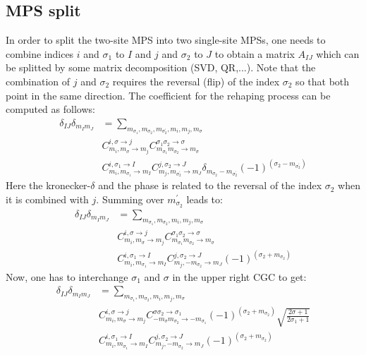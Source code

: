 \documentclass[a4paper,10pt,parskip=full]{scrartcl}
\begin{document}
\subsection{MPS split}
In order to split the two-site MPS into two single-site MPSs, one
needs to combine indices $i$ and $\sigma_1$ to $I$ and $j$ and $\sigma_2$ to $J$
to obtain a matrix $A_{IJ}$ which can be splitted by some matrix
decomposition (SVD, QR,...). Note that the combination of $j$ and
$\sigma_2$ requires the reversal (flip) of the index $\sigma_2$ so that both
point in the same direction. The coefficient for the rehaping process
can be computed as follows:
\begin{equation}
  \begin{split}
    \delta_{IJ}\delta_{m_Im_J}&=
    \sum_{m_{\sigma_1},m_{\sigma_2}, m_{\sigma_2^\prime},m_{i},m_j,m_{\sigma}}\\
    &C^{i,\sigma\rightarrow j}_{m_{i},m_{\sigma}\rightarrow m_{j}}
    C^{\sigma_1\sigma_2\rightarrow\sigma}_{m_{\sigma_1}m_{\sigma_2}\rightarrow m_{\sigma}}\\
    &C^{i,\sigma_1\rightarrow I}_{m_i,m_{\sigma_1}\rightarrow m_{I}}
    C^{j,\sigma_2\rightarrow J}_{m_j,m_{\sigma_2^\prime}\rightarrow m_{J}}\delta_{m_{\sigma_2}-m_{\sigma_2^\prime}}(-1)^{(\sigma_2-m_{\sigma_2^\prime})}
  \end{split}
\end{equation}
Here the kronecker-$\delta$ and the phase is related to the reversal
of the index $\sigma_2$ when it is combined with $j$.
Summing over $m_{\sigma_2}^\prime$ leads to:
\begin{equation}
  \begin{split}
    \delta_{IJ}\delta_{m_Im_J}&=
    \sum_{m_{\sigma_1},m_{\sigma_2},m_{i},m_j,m_{\sigma}}\\
    &C^{i,\sigma\rightarrow j}_{m_{i},m_{\sigma}\rightarrow m_{j}}
    C^{\sigma_1\sigma_2\rightarrow\sigma}_{m_{\sigma_1}m_{\sigma_2}\rightarrow m_{\sigma}}\\
    &C^{i,\sigma_1\rightarrow I}_{m_i,m_{\sigma_1}\rightarrow m_{I}}
    C^{j,\sigma_2\rightarrow J}_{m_j,-m_{\sigma_2}\rightarrow m_{J}}(-1)^{(\sigma_2+m_{\sigma_2})}
  \end{split}
\end{equation}
Now, one has to interchange $\sigma_1$ and $\sigma$ in the upper right
CGC to get:
\begin{equation}
  \begin{split}
    \delta_{IJ}\delta_{m_Im_J}&=
    \sum_{m_{\sigma_1},m_{\sigma_2},m_{i},m_j,m_{\sigma}}\\
    &C^{i,\sigma\rightarrow j}_{m_{i},m_{\sigma}\rightarrow m_{j}}
    C^{\sigma\sigma_2\rightarrow\sigma_1}_{-m_{\sigma}m_{\sigma_2}\rightarrow -m_{\sigma_1}}(-1)^{(\sigma_2+m_{\sigma_2})}\sqrt{\frac{2\sigma+1}{2\sigma_1+1}}\\
    &C^{i,\sigma_1\rightarrow I}_{m_i,m_{\sigma_1}\rightarrow m_{I}}
    C^{j,\sigma_2\rightarrow J}_{m_j,-m_{\sigma_2}\rightarrow m_{J}}(-1)^{(\sigma_2+m_{\sigma_2})}
  \end{split}
\end{equation}
\end{document}
